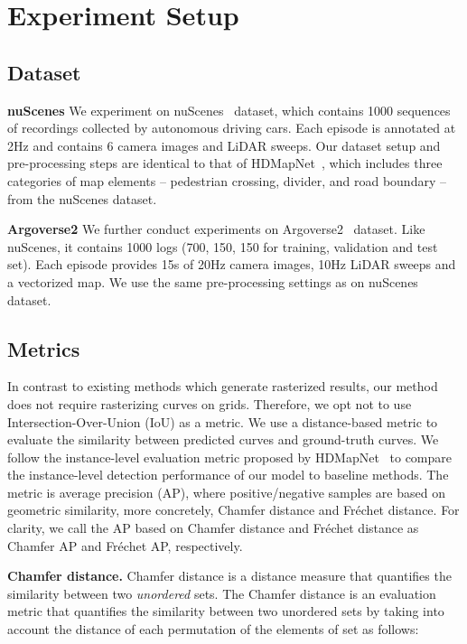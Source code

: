 \documentclass{article}
\theoremstyle{plain}
\theoremstyle{definition}
\theoremstyle{remark}
\begin{document}




\newpage
\appendix
\onecolumn


\label{Appendix}


\section{Experiment Setup}
\subsection{Dataset} 
\label{subsec:dataset}
\noindent\textbf{nuScenes}
We experiment on nuScenes~\citep{caesar2020nuscenes} dataset, which contains 1000 sequences of recordings collected by autonomous driving cars. Each episode is annotated at 2Hz and contains 6 camera images and LiDAR sweeps. 
Our dataset setup and pre-processing steps are identical to that of HDMapNet~\citep{li2021hdmapnet}, which includes three categories of map elements -- pedestrian crossing, divider, and road boundary -- from the nuScenes dataset.

\noindent\textbf{Argoverse2}
We further conduct experiments on Argoverse2~\citep{Argoverse2} dataset. Like nuScenes, it contains 1000 logs (700, 150, 150 for training, validation and test set). Each episode provides 15s of 20Hz camera images, 10Hz LiDAR sweeps and a vectorized map. We use the same pre-processing settings as on nuScenes dataset.


\subsection{Metrics}
\label{sec:metric}
In contrast to existing methods which generate rasterized results, our method does not require rasterizing curves on grids. Therefore, we opt not to use Intersection-Over-Union (IoU) as a metric. We use a distance-based metric to evaluate the similarity between predicted curves and ground-truth curves. 
We follow the instance-level evaluation metric proposed by HDMapNet~\citep{li2021hdmapnet} to compare the instance-level detection performance of our model to baseline methods.
The metric is average precision (AP), where positive/negative samples are based on geometric similarity, more concretely, Chamfer distance and Fr\'echet distance. For clarity, we call the AP based on Chamfer distance and Fr\'echet distance as Chamfer AP and Fr\'echet AP, respectively.

\noindent\textbf{Chamfer distance.}
Chamfer distance is a distance measure that quantifies the similarity between two \emph{unordered} sets.
The Chamfer distance is an evaluation metric that quantifies the similarity between two unordered sets by taking into account the distance of each permutation of the elements of set as follows: 
\end{document}

